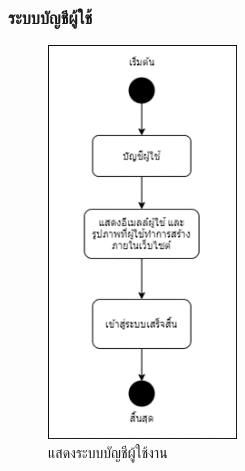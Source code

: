 \documentclass[12pt,oneside,openright,a4paper]{cpe-thai-project}
\begin{document}
\newpage

\subsubsection{ระบบบัญชีผู้ใช้}

\begin{figure}[!h]
  \centering
  \includegraphics[width=5cm]{./image/ad-user.png}
  \caption{แสดงระบบบัญชีผู้ใช้งาน}
  \label{fig:ad-user}
\end{figure}
\end{document}
